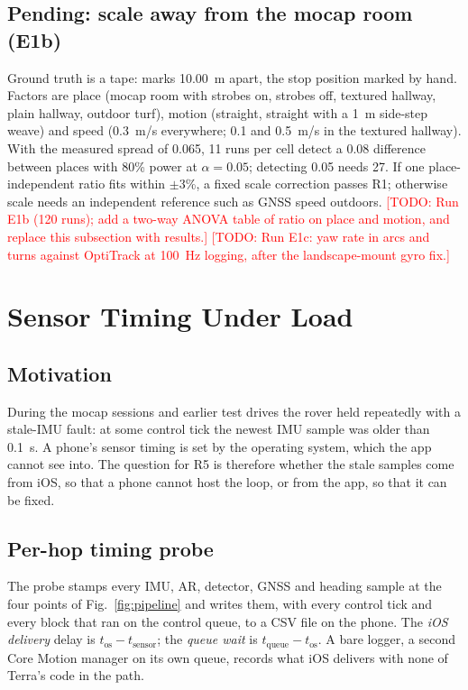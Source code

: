 \documentclass[conference]{IEEEtran}
\newcommand{\todo}[1]{\textcolor{red}{[TODO: #1]}}
\newcommand{\tsens}{t_{\text{sensor}}}
\newcommand{\tos}{t_{\text{os}}}
\newcommand{\tqueue}{t_{\text{queue}}}
\begin{document}
\subsection{Pending: scale away from the mocap room (E1b)}
Ground truth is a tape: marks 10.00~m apart, the stop position marked by hand.
Factors are place (mocap room with strobes on, strobes off, textured hallway, plain hallway, outdoor turf), motion (straight, straight with a 1~m side-step weave) and speed (0.3~m/s everywhere; 0.1 and 0.5~m/s in the textured hallway).
With the measured spread of 0.065, 11 runs per cell detect a 0.08 difference between places with 80\% power at $\alpha = 0.05$; detecting 0.05 needs 27.
If one place-independent ratio fits within $\pm$3\%, a fixed scale correction passes R1; otherwise scale needs an independent reference such as GNSS speed outdoors.
\todo{Run E1b (120 runs); add a two-way ANOVA table of ratio on place and motion, and replace this subsection with results.}
\todo{Run E1c: yaw rate in arcs and turns against OptiTrack at 100~Hz logging, after the landscape-mount gyro fix.}

\section{Sensor Timing Under Load}
\label{sec:timing}

\subsection{Motivation}

During the mocap sessions and earlier test drives the rover held repeatedly with a stale-IMU fault: at some control tick the newest IMU sample was older than 0.1~s.
A phone's sensor timing is set by the operating system, which the app cannot see into.
The question for R5 is therefore whether the stale samples come from iOS, so that a phone cannot host the loop, or from the app, so that it can be fixed.

\subsection{Per-hop timing probe}

The probe stamps every IMU, AR, detector, GNSS and heading sample at the four points of Fig.~\ref{fig:pipeline} and writes them, with every control tick and every block that ran on the control queue, to a CSV file on the phone.
The \emph{iOS delivery} delay is $\tos - \tsens$; the \emph{queue wait} is $\tqueue - \tos$.
A bare logger, a second Core Motion manager on its own queue, records what iOS delivers with none of Terra's code in the path.
\end{document}
